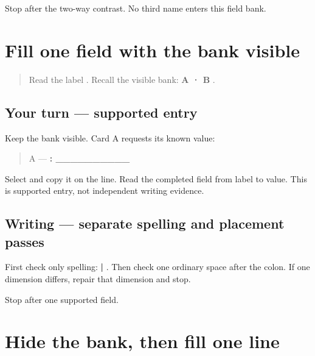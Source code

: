 \begin{tcolorbox}[breakable,colback=teal!4,colframe=teal!35!black,title={Before you move on}]
Stop after the two-way contrast. No third name enters this field bank.
\end{tcolorbox}
\section[\texorpdfstring{\hi{नाम}: \hi{मीरा} (nām: Mīrā)}{नाम: मीरा (nām: Mīrā)}]{Fill one field with the bank visible}

\label{lesson:HI-A1F01-name-supported}



\begin{quote}
Read the label \textbf{}. Recall the visible bank: \textbf{A  · B }.
\end{quote}

\subsection*{Your turn — supported entry}
Keep the bank visible. Card A requests its known value:

\begin{quote}
A — \textbf{: \_\_\_\_\_\_\_\_\_\_}
\end{quote}

Select \textbf{} and copy it on the line. Read the completed field from label to value. This is supported entry, not independent writing evidence.

\subsection*{Writing — separate spelling and placement passes}
First check only spelling: \textbf{ | }. Then check one ordinary space after the colon. If one dimension differs, repair that dimension and stop.

\begin{tcolorbox}[breakable,colback=teal!4,colframe=teal!35!black,title={Before you move on}]
Stop after one supported field.
\end{tcolorbox}
\section[\texorpdfstring{B to \hi{अरुण} (B cue: Aruṇ)}{B to अरुण (B cue: Aruṇ)}]{Hide the bank, then fill one line}

\label{lesson:HI-A1F01-name-delayed}



